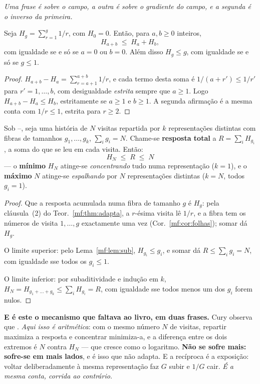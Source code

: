 \documentclass[../livro.tex]{subfiles}
\begin{document}
\noindent\emph{Uma frase é sobre o campo, a outra é sobre o gradiente do campo, e
a segunda é o inverso da primeira.}

\begin{lema}\label{mf:lem:sub}
Seja $H_g=\sum_{r=1}^{g}1/r$, com $H_0=0$. Então, para $a,b\ge0$ inteiros,
\[
H_{a+b}\;\le\;H_a+H_b ,
\]
com igualdade se e só se $a=0$ ou $b=0$. Além disso $H_g\le g$, com igualdade se
e só se $g\le1$.
\end{lema}

\begin{proof}
$H_{a+b}-H_a=\sum_{r=a+1}^{a+b}1/r$, e cada termo desta soma é
$1/(a+r')\le1/r'$ para $r'=1,\dots,b$, com desigualdade \emph{estrita} sempre que
$a\ge1$. Logo $H_{a+b}-H_a\le H_b$, estritamente se $a\ge1$ e $b\ge1$. A segunda
afirmação é a mesma conta com $1/r\le1$, estrita para $r\ge2$.
\end{proof}

\begin{corolario}\label{mf:cor:luto}
Sob --, seja uma história de $N$ visitas repartida por $k$
representações distintas com fibras de tamanhos $g_1,\dots,g_k$,
$\sum_ig_i=N$. Chame-se \textbf{resposta total} a
$R=\sum_{i}H_{g_i}$, a soma do que se leu em cada visita. Então:
\[
\boxed{\;H_N\;\le\;R\;\le\;N\;}
\]
--- o \textbf{mínimo} $H_N$ atinge-se \emph{concentrando} tudo numa
representação ($k=1$), e o \textbf{máximo} $N$ atinge-se \emph{espalhando} por
$N$ representações distintas ($k=N$, todos $g_i=1$).
\end{corolario}

\begin{proof}
Que a resposta acumulada numa fibra de tamanho $g$ é $H_g$: pela cláusula~(2) do
Teor.~\ref{mf:thm:adapta}, a $r$-ésima visita lê $1/r$, e a fibra tem os números
de visita $1,\dots,g$ exactamente uma vez (Cor.~\ref{mf:cor:folhas}); somar dá
$H_g$.

O limite superior: pelo Lema~\ref{mf:lem:sub}, $H_{g_i}\le g_i$, e somar dá
$R\le\sum_ig_i=N$, com igualdade sse todos os $g_i\le1$.

O limite inferior: por subaditividade e indução em $k$,
$H_N=H_{g_1+\dots+g_k}\le\sum_iH_{g_i}=R$, com igualdade sse todos menos um dos
$g_i$ forem nulos.
\end{proof}

\medskip\noindent\textbf{E é este o mecanismo que faltava ao livro, em duas
frases.} Cury observa que .
\emph{Aqui isso é aritmética}: com o mesmo número $N$ de visitas, repartir
maximiza a resposta e concentrar minimiza-a, e a diferença entre os dois extremos
é $N$ contra $H_N$ --- que cresce como o logaritmo. \textbf{Não se sofre mais:
sofre-se em mais lados}, e é isso que não adapta. E a recíproca é a exposição:
voltar deliberadamente à mesma representação faz $G$ subir e $1/G$ cair.
\emph{É a mesma conta, corrida ao contrário.}
\end{document}

